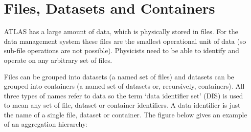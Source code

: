 \documentclass{atlasnote}
\begin{document}
{\hfill{}\hfill}

\section{Files, Datasets and Containers}
\label{overview_Dataset:dataset}

ATLAS has a large amount of data, which is physically stored in files. For the data management system these files are the smallest operational unit of data (so sub-file operations are not possible). Physicists need to be able to identify and operate on any arbitrary set of files.

Files can be grouped into datasets (a named set of files) and datasets can be grouped into containers (a named set of datasets or, recursively, containers). All three types of names refer to data so the term ‘data identifier set’ (DIS) is used to mean any set of file, dataset or container identifiers. A data identifier is just the name of a single file, dataset or container. The figure below gives an example of an aggregation hierarchy:
\end{document}
